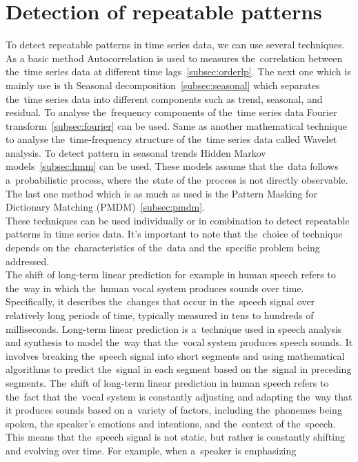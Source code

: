 \section{Detection of repeatable patterns}\label{sec:patterns}
To detect repeatable patterns in time series data, we can use several techniques. As a basic method
Autocorrelation is used to measures the~correlation between the~time series data at different time
lags~\ref{subsec:orderlp}.
The next one which is mainly use is th Seasonal decomposition~\ref{subsec:seasonal} which separates the~time
series data into different components such as trend, seasonal, and residual. To analyse the~frequency components
of the~time series data Fourier transform~\ref{subsec:fourier} can be used. Same as another mathematical
technique to analyse the~time-frequency structure of the~time series data called Wavelet analysis.
To detect pattern in seasonal trends Hidden Markov models~\ref{subsec:hmm} can be used.
These models assume that the~data follows a~probabilistic process, where the~state of the~process is not
directly observable. The last one method which is as much as used is the Pattern Masking for Dictionary
Matching (PMDM)~\ref{subsec:pmdm}.\\
These techniques can be used individually or in combination to detect repeatable patterns in time series data.
It's important to note that the~choice of technique depends on the~characteristics of the~data and the~specific
problem being addressed.\\
The shift of long-term linear prediction for example in human speech refers to the~way in which the~human vocal
system produces sounds over time. Specifically, it describes the~changes that occur in the~speech signal over
relatively long periods of time, typically measured in tens to hundreds of milliseconds. Long-term linear
prediction is a~technique used in speech analysis and synthesis to model the~way that the~vocal system produces
speech sounds. It involves breaking the~speech signal into short segments and using mathematical algorithms to
predict the~signal in each segment based on the~signal in preceding segments. The~shift of long-term linear
prediction in human speech refers to the~fact that the~vocal system is constantly adjusting and adapting
the~way that it produces sounds based on a~variety of factors, including the~phonemes being spoken,
the speaker's emotions and intentions, and the~context of the~speech. This means that the~speech signal is not
static, but rather is constantly shifting and evolving over time. For example, when a~speaker is emphasizing
